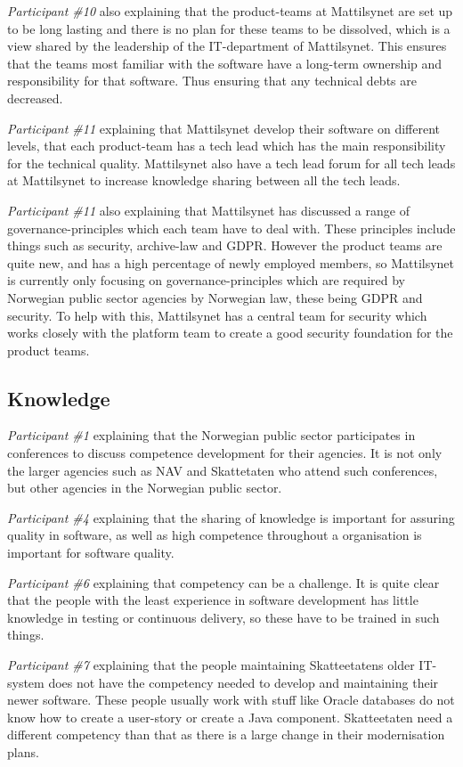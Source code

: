 \textit{Participant \#10} also explaining that the product-teams at Mattilsynet are set up to be long lasting and there is no plan for these teams to be dissolved, which is a view shared by the leadership of the IT-department of Mattilsynet. This ensures that the teams most familiar with the software have a long-term ownership and responsibility for that software. Thus ensuring that any technical debts are decreased.

\textit{Participant \#11} explaining that Mattilsynet develop their software on different levels, that each product-team has a tech lead which has the main responsibility for the technical quality. Mattilsynet also have a tech lead forum for all tech leads at Mattilsynet to increase knowledge sharing between all the tech leads.

\textit{Participant \#11} also explaining that Mattilsynet has discussed a range of governance-principles which each team have to deal with. These principles include things such as security, archive-law and GDPR. However the product teams are quite new, and has a high percentage of newly employed members, so Mattilsynet is currently only focusing on governance-principles which are required by Norwegian public sector agencies by Norwegian law, these being GDPR and security.
To help with this, Mattilsynet has a central team for security which works closely with the platform team to create a good security foundation for the product teams. 

\subsection{Knowledge}
\textit{Participant \#1} explaining that the Norwegian public sector participates in conferences to discuss competence development for their agencies. It is not only the larger agencies such as NAV and Skattetaten who attend such conferences, but other agencies in the Norwegian public sector.

\textit{Participant \#4} explaining that the sharing of knowledge is important for assuring quality in software, as well as high competence throughout a organisation is important for software quality.  

\textit{Participant \#6} explaining that competency can be a challenge. It is quite clear that the people with the least experience in software development has little knowledge in testing or continuous delivery, so these have to be trained in such things.

\textit{Participant \#7} explaining that the people maintaining Skatteetatens older IT-system does not have the competency needed to develop and maintaining their newer software. These people usually work with stuff like Oracle databases do not know how to create a user-story or create a Java component. Skatteetaten need a different competency than that as there is a large change in their modernisation plans.

